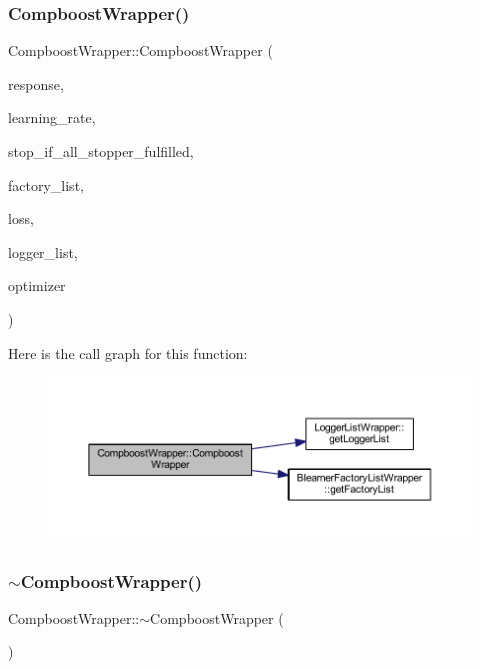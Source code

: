 \subsubsection{\texorpdfstring{Compboost\+Wrapper()}{CompboostWrapper()}}
{\footnotesize\ttfamily Compboost\+Wrapper\+::\+Compboost\+Wrapper (\begin{DoxyParamCaption}\item[{arma\+::vec}]{response,  }\item[{double}]{learning\+\_\+rate,  }\item[{bool}]{stop\+\_\+if\+\_\+all\+\_\+stopper\+\_\+fulfilled,  }\item[{\mbox{\hyperlink{class_blearner_factory_list_wrapper}{Blearner\+Factory\+List\+Wrapper}} \&}]{factory\+\_\+list,  }\item[{\mbox{\hyperlink{class_loss_wrapper}{Loss\+Wrapper}} \&}]{loss,  }\item[{\mbox{\hyperlink{class_logger_list_wrapper}{Logger\+List\+Wrapper}} \&}]{logger\+\_\+list,  }\item[{\mbox{\hyperlink{class_optimizer_wrapper}{Optimizer\+Wrapper}} \&}]{optimizer }\end{DoxyParamCaption})\hspace{0.3cm}{\ttfamily [inline]}}

Here is the call graph for this function\+:\nopagebreak
\begin{figure}[H]
\begin{center}
\leavevmode
\includegraphics[width=350pt]{class_compboost_wrapper_a5c2f3c21c22aea08b042d91072f43707_cgraph}
\end{center}
\end{figure}
\mbox{\label{class_compboost_wrapper_a0376c00d5b68a206a1d5ecfc13a085b1}} 
\subsubsection{\texorpdfstring{$\sim$\+Compboost\+Wrapper()}{~CompboostWrapper()}}
{\footnotesize\ttfamily Compboost\+Wrapper\+::$\sim$\+Compboost\+Wrapper (\begin{DoxyParamCaption}{ }\end{DoxyParamCaption})\hspace{0.3cm}{\ttfamily [inline]}}



